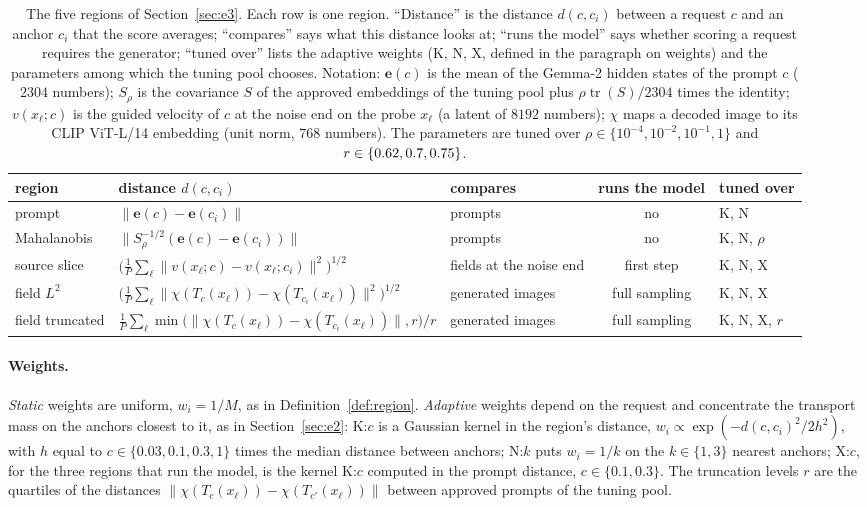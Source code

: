\documentclass{article}
\newcommand{\be}{\mathbf{e}}
\theoremstyle{plain}
\theoremstyle{remark}
\begin{document}
\begin{table}[!htbp]
\centering
\caption{The five regions of Section~\ref{sec:e3}. Each row is one region. ``Distance'' is the distance $d(c,c_i)$ between a
request $c$ and an anchor $c_i$ that the score averages; ``compares'' says what this distance looks at; ``runs the model'' says
whether scoring a request requires the generator; ``tuned over'' lists the adaptive weights (K, N, X, defined in the paragraph on
weights) and the parameters among which the tuning pool chooses. Notation: $\be(c)$ is the mean of the Gemma-2 hidden states of the
prompt $c$ ($2304$ numbers); $S_\rho$ is the covariance $S$ of the approved embeddings of the tuning pool plus $\rho\operatorname{tr}(S)/2304$
times the identity; $v(x_\ell;c)$ is the guided velocity of $c$ at the noise end on the probe $x_\ell$ (a latent of $8192$
numbers); $\chi$ maps a decoded image to its CLIP ViT-L/14 embedding (unit norm, $768$ numbers). The parameters are tuned over
$\rho\in\{10^{-4},10^{-2},10^{-1},1\}$ and $r\in\{0.62, 0.7, 0.75\}$.}
\label{tab:e3_regions}
\small
\setlength{\tabcolsep}{4pt}
\begin{tabular}{l l l c l}
\toprule
region & distance $d(c,c_i)$ & compares & runs the model & tuned over \\
\midrule
prompt & $\|\be(c)-\be(c_i)\|$ & prompts & no & K, N \\
Mahalanobis & $\|S_\rho^{-1/2}(\be(c)-\be(c_i))\|$ & prompts & no & K, N, $\rho$ \\
source slice & $\big(\frac1P\sum_\ell\|v(x_\ell;c)-v(x_\ell;c_i)\|^2\big)^{1/2}$ & fields at the noise end & first step & K, N, X \\
field $L^2$ & $\big(\frac1P\sum_\ell\|\chi(T_c(x_\ell))-\chi(T_{c_i}(x_\ell))\|^2\big)^{1/2}$ & generated images & full sampling & K, N, X \\
field truncated & $\frac1P\sum_\ell\min\big(\|\chi(T_c(x_\ell))-\chi(T_{c_i}(x_\ell))\|,r\big)/r$ & generated images & full sampling & K, N, X, $r$ \\
\bottomrule
\end{tabular}
\end{table}

\paragraph{Weights.}
\emph{Static} weights are uniform, $w_i=1/M$, as in Definition~\ref{def:region}. \emph{Adaptive} weights depend on the request and
concentrate the transport mass on the anchors closest to it, as in Section~\ref{sec:e2}: K:$c$ is a Gaussian kernel in the
region's distance, $w_i\propto\exp(-d(c,c_i)^2/2h^2)$, with $h$ equal to $c\in\{0.03,0.1,0.3,1\}$ times the median distance between
anchors; N:$k$ puts $w_i=1/k$ on the $k\in\{1,3\}$ nearest anchors; X:$c$, for the three regions that run the model, is the kernel
K:$c$ computed in the prompt distance, $c\in\{0.1,0.3\}$. The truncation levels $r$ are the quartiles of the distances
$\|\chi(T_c(x_\ell))-\chi(T_{c'}(x_\ell))\|$ between approved prompts of the tuning pool.
\end{document}
